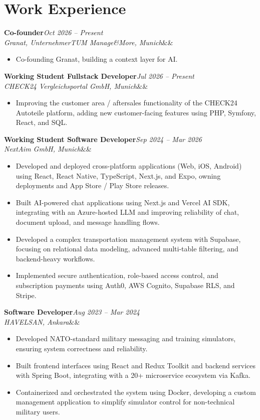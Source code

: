 \documentclass[10pt,a4paper]{article}
\newcommand{\role}[4]{\textbf{#1}\hfill\textit{#2}\\\textit{#3}\ifx&#4&\else\ \textperiodcentered\ #4\fi}
\begin{document}
\section{Work Experience}
\role{Co-founder}{Oct 2026 -- Present}{Granat, UnternehmerTUM Manage\&More, Munich}{}
\begin{itemize}
  \item Co-founding Granat, building a context layer for AI.
\end{itemize}
\role{Working Student Fullstack Developer}{Jul 2026 -- Present}{CHECK24 Vergleichsportal GmbH, Munich}{}
\begin{itemize}
  \item Improving the customer area / aftersales functionality of the CHECK24 Autoteile platform, adding new
        customer-facing features using PHP, Symfony, React, and SQL.
\end{itemize}
\role{Working Student Software Developer}{Sep 2024 -- Mar 2026}{NextAim GmbH, Munich}{}
\begin{itemize}
  \item Developed and deployed cross-platform applications (Web, iOS, Android) using React, React Native, TypeScript,
        Next.js, and Expo, owning deployments and App Store / Play Store releases.
  \item Built AI-powered chat applications using Next.js and Vercel AI SDK, integrating with an Azure-hosted LLM and
        improving reliability of chat, document upload, and message handling flows.
  \item Developed a complex transportation management system with Supabase, focusing on relational data modeling,
        advanced multi-table filtering, and backend-heavy workflows.
  \item Implemented secure authentication, role-based access control, and subscription payments using Auth0,
        AWS Cognito, Supabase RLS, and Stripe.
\end{itemize}
\role{Software Developer}{Aug 2023 -- Mar 2024}{HAVELSAN, Ankara}{}
\begin{itemize}
  \item Developed NATO-standard military messaging and training simulators, ensuring system correctness and reliability.
  \item Built frontend interfaces using React and Redux Toolkit and backend services with Spring Boot, integrating with
        a 20+ microservice ecosystem via Kafka.
  \item Containerized and orchestrated the system using Docker, developing a custom management application to simplify
        simulator control for non-technical military users.
\end{itemize}
\end{document}
